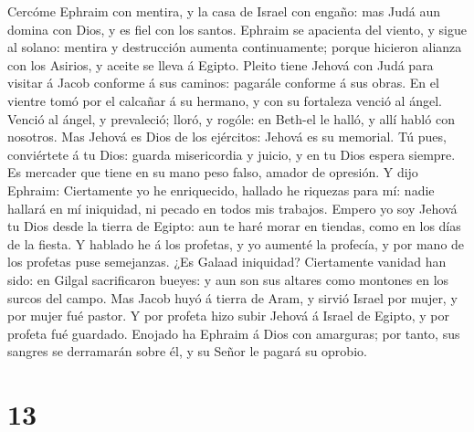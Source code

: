  Cercóme Ephraim con mentira, y la casa de Israel con
engaño: mas Judá aun domina con Dios, y es fiel con los santos.
 Ephraim se apacienta del viento, y sigue al solano:
mentira y destrucción aumenta continuamente; porque hicieron alianza con
los Asirios, y aceite se lleva á Egipto.  Pleito tiene
Jehová con Judá para visitar á Jacob conforme á sus caminos: pagarále
conforme á sus obras.  En el vientre tomó por el calcañar
á su hermano, y con su fortaleza venció al ángel.  Venció
al ángel, y prevaleció; lloró, y rogóle: en Beth-el le halló, y allí
habló con nosotros.  Mas Jehová es Dios de los ejércitos:
Jehová es su memorial.  Tú pues, conviértete á tu Dios:
guarda misericordia y juicio, y en tu Dios espera siempre.
 Es mercader que tiene en su mano peso falso, amador de
opresión.  Y dijo Ephraim: Ciertamente yo he enriquecido,
hallado he riquezas para mí: nadie hallará en mí iniquidad, ni pecado en
todos mis trabajos.  Empero yo soy Jehová tu Dios desde
la tierra de Egipto: aun te haré morar en tiendas, como en los días de
la fiesta.  Y hablado he á los profetas, y yo aumenté la
profecía, y por mano de los profetas puse semejanzas. 
¿Es Galaad iniquidad? Ciertamente vanidad han sido: en Gilgal
sacrificaron bueyes: y aun son sus altares como montones en los surcos
del campo.  Mas Jacob huyó á tierra de Aram, y sirvió
Israel por mujer, y por mujer fué pastor.  Y por profeta
hizo subir Jehová á Israel de Egipto, y por profeta fué guardado.
Enojado ha Ephraim á Dios con amarguras; por tanto, sus sangres se
derramarán sobre él, y su Señor le pagará su oprobio.

\hypertarget{section-12}{%
\section{13}\label{section-12}}

